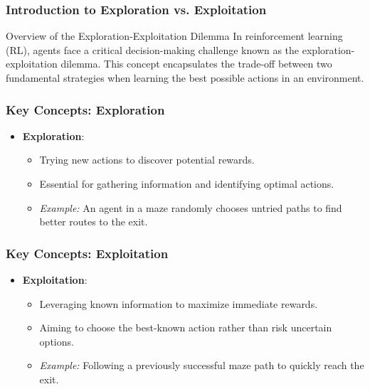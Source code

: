 \documentclass[aspectratio=169]{beamer}
\begin{document}
\frame{\titlepage}

\begin{frame}[fragile]
    \frametitle{Introduction to Exploration vs. Exploitation}
    \begin{block}{Overview of the Exploration-Exploitation Dilemma}
        In reinforcement learning (RL), agents face a critical decision-making challenge known as the \alert{exploration-exploitation dilemma}. This concept encapsulates the trade-off between two fundamental strategies when learning the best possible actions in an environment.
    \end{block}
\end{frame}

\begin{frame}[fragile]
    \frametitle{Key Concepts: Exploration}
    \begin{itemize}
        \item \textbf{Exploration}: 
        \begin{itemize}
            \item Trying new actions to discover potential rewards.
            \item Essential for gathering information and identifying optimal actions.
            \item \textit{Example:} An agent in a maze randomly chooses untried paths to find better routes to the exit.
        \end{itemize}
    \end{itemize}
\end{frame}

\begin{frame}[fragile]
    \frametitle{Key Concepts: Exploitation}
    \begin{itemize}
        \item \textbf{Exploitation}: 
        \begin{itemize}
            \item Leveraging known information to maximize immediate rewards.
            \item Aiming to choose the best-known action rather than risk uncertain options.
            \item \textit{Example:} Following a previously successful maze path to quickly reach the exit.
        \end{itemize}
    \end{itemize}
\end{frame}
\end{document}
